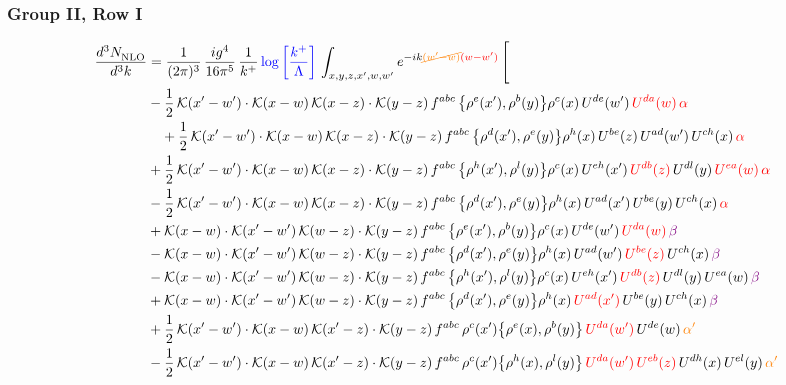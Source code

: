 \documentclass[9pt]{article}
\numberwithin{equation}{section}
\begin{document}
\subsubsection{Group II, Row I}
\begin{align}
     \frac{d^{3}N_{\rm NLO}^{\rm}}{d^{3}k}  & = \frac{1}{(2\pi)^{3}}\, \frac{ig^{4}}{16\pi^{5}}\, \frac{1}{k^{+}}\, {\color{blue}\log{\left[\frac{k^{+}}{\Lambda}\right]}}\, \int_{x,y,z,x^{\prime},w,w^{\prime}}e^{-ik{\color{orange}\cancel{(w^{\prime}-w)}}{\color{red}(w-w^{\prime})}}\, \Bigg[\notag \\ & -\frac{1}{2}\,\mathcal{K}(x'-w')\cdot\mathcal{K}(x-w)\,\mathcal{K}(x-z)\cdot\mathcal{K}(y-z)\, f^{abc}\,\big\{\rho^{e}(x'),\rho^{b}(y)\big\}\rho^{c}(x)\,U^{de}(w')\,{\color{red}U^{da}(w)}\,{\color{red}\alpha}\notag \\ &\quad+\frac{1}{2}\,\mathcal{K}(x'-w')\cdot\mathcal{K}(x-w)\,\mathcal{K}(x-z)\cdot\mathcal{K}(y-z)\, f^{abc}\,\big\{\rho^{d}(x'),\rho^{e}(y)\big\}\rho^{h}(x)\,U^{be}(z)\,U^{ad}(w')\,U^{ch}(x)\,{\color{red}\alpha}\notag\\ & +\frac{1}{2}\,\mathcal{K}(x'-w')\cdot\mathcal{K}(x-w)\,\mathcal{K}(x-z)\cdot\mathcal{K}(y-z)\, f^{abc}\,\big\{\rho^{h}(x'),\rho^{l}(y)\big\}\rho^{c}(x)\,U^{eh}(x')\,{\color{red}U^{db}(z)}\,U^{dl}(y)\,{\color{red}U^{ea}(w)}\,{\color{red}\alpha}\notag \\ &-\frac{1}{2}\,\mathcal{K}(x'-w')\cdot\mathcal{K}(x-w)\,\mathcal{K}(x-z)\cdot\mathcal{K}(y-z)\, f^{abc}\,\big\{\rho^{d}(x'),\rho^{e}(y)\big\}\rho^{h}(x)\,U^{ad}(x')\,U^{be}(y)\,U^{ch}(x)\,{\color{red}\alpha}\notag\\ &+\mathcal{K}(x-w)\cdot\mathcal{K}(x'-w')\,\mathcal{K}(w-z)\cdot\mathcal{K}(y-z)\, f^{abc}\,\big\{\rho^{e}(x'),\rho^{b}(y)\big\}\rho^{c}(x)\,U^{de}(w')\,{\color{red}U^{da}(w)}\,{\color{violet}\beta}\notag\\ &-\mathcal{K}(x-w)\cdot\mathcal{K}(x'-w')\,\mathcal{K}(w-z)\cdot\mathcal{K}(y-z)\, f^{abc}\,\big\{\rho^{d}(x'),\rho^{e}(y)\big\}\rho^{h}(x)\,U^{ad}(w')\,{\color{red}U^{be}(z)}\,U^{ch}(x)\,{\color{violet}\beta}\notag \\ &-\mathcal{K}(x-w)\cdot\mathcal{K}(x'-w')\,\mathcal{K}(w-z)\cdot\mathcal{K}(y-z)\, f^{abc}\,\big\{\rho^{h}(x'),\rho^{l}(y)\big\}\rho^{c}(x)\,U^{eh}(x')\,{\color{red}U^{db}(z)}\,U^{dl}(y)\,U^{ea}(w)\,{\color{violet}\beta}\notag \\ & +\mathcal{K}(x-w)\cdot\mathcal{K}(x'-w')\,\mathcal{K}(w-z)\cdot\mathcal{K}(y-z)\, f^{abc}\,\big\{\rho^{d}(x'),\rho^{e}(y)\big\}\rho^{h}(x)\,{\color{red}U^{ad}(x')}\,U^{be}(y)\,U^{ch}(x)\,{\color{violet}\beta}\notag \\ &+\frac{1}{2}\,\mathcal{K}(x'-w')\cdot\mathcal{K}(x-w)\,\mathcal{K}(x'-z)\cdot\mathcal{K}(y-z)\, f^{abc}\,\rho^{c}(x')\big\{\rho^{e}(x),\rho^{b}(y)\big\}\,{\color{red}U^{da}(w')}\,U^{de}(w)\,{\color{orange}\alpha'}\notag \\ &-\frac{1}{2}\,\mathcal{K}(x'-w')\cdot\mathcal{K}(x-w)\,\mathcal{K}(x'-z)\cdot\mathcal{K}(y-z)\, f^{abc}\,\rho^{c}(x')\big\{\rho^{h}(x),\rho^{l}(y)\big\}\,{\color{red}U^{da}(w')}\,{\color{red}U^{eb}(z)}\,U^{dh}(x)\,U^{el}(y)\,{\color{orange}\alpha'}\notag \\ 
\end{align}
\end{document}
